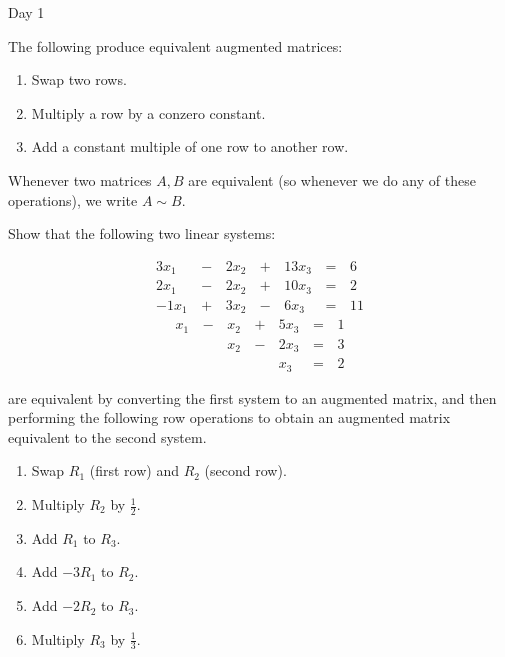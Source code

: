 \begin{applicationActivities}{Day 1}
\begin{definition}
  The following  produce equivalent
  augmented matrices:
  \begin{enumerate}
    \item Swap two rows.
    \item Multiply a row by a conzero constant.
    \item Add a constant multiple of one row to another row.
  \end{enumerate}
  Whenever two matrices \(A,B\) are equivalent (so whenever we do any of
  these operations), we write \(A\sim B\).
\end{definition}

\begin{activity}
  Show that the following two linear systems:
  \begin{multicols}{2}\noindent
    \begin{alignat*}{4}
      3x_1 &\,-\,& 2x_2 &\,+\,& 13x_3 &\,=\,& 6 \\
      2x_1 &\,-\,& 2x_2 &\,+\,& 10x_3 &\,=\,& 2 \\
     -1x_1 &\,+\,& 3x_2 &\,-\,&  6x_3 &\,=\,& 11
    \end{alignat*}
    \begin{alignat*}{4}
       x_1 &\,-\,&  x_2  &\,+\,&  5x_3 &\,=\,& 1 \\
           &\, \,&  x_2 &\,-\,&  2x_3 &\,=\,& 3 \\
           &\, \,&      &\, \,&   x_3 &\,=\,& 2
    \end{alignat*}
  \end{multicols}
  are equivalent by converting the first system to an augmented matrix,
  and then performing the following row operations to obtain
  an augmented matrix equivalent to the second system.
  \begin{multicols}{2}\noindent
  \begin{enumerate}
    \item Swap \(R_1\) (first row) and \(R_2\) (second row).
    \item Multiply \(R_2\) by \(\frac{1}{2}\).
    \item Add \(R_1\) to \(R_3\).
    \item Add \(-3R_1\) to \(R_2\).
    \item Add \(-2R_2\) to \(R_3\).
    \item Multiply \(R_3\) by \(\frac{1}{3}\).
  \end{enumerate}
  \end{multicols}
\end{activity}


\end{applicationActivities}
